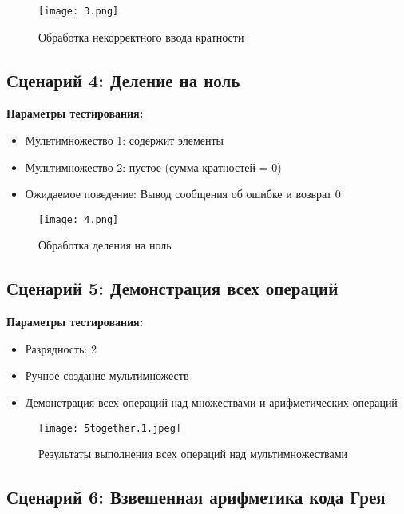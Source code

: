 \documentclass[12pt,a4paper]{article}
\begin{document}
\begin{figure}[h]
    \centering
    \texttt{[image: 3.png]}
    \caption{Обработка некорректного ввода кратности}
    \label{fig:invalid_multiplicity}
\end{figure}

\subsection{Сценарий 4: Деление на ноль}

\textbf{Параметры тестирования:}
\begin{itemize}
    \item Мультимножество 1: содержит элементы
    \item Мультимножество 2: пустое (сумма кратностей = 0)
    \item Ожидаемое поведение: Вывод сообщения об ошибке и возврат 0
\end{itemize}

\begin{figure}[h]
    \centering
    \texttt{[image: 4.png]}
    \caption{Обработка деления на ноль}
    \label{fig:division_by_zero}
\end{figure}

\subsection{Сценарий 5: Демонстрация всех операций}

\textbf{Параметры тестирования:}
\begin{itemize}
    \item Разрядность: 2
    \item Ручное создание мультимножеств
    \item Демонстрация всех операций над множествами и арифметических операций
\end{itemize}

\begin{figure}[h]
    \centering
    \texttt{[image: 5together.1.jpeg]}
    \caption{Результаты выполнения всех операций над мультимножествами}
    \label{fig:all_operations}
\end{figure}

\subsection{Сценарий 6: Взвешенная арифметика кода Грея}
\end{document}
